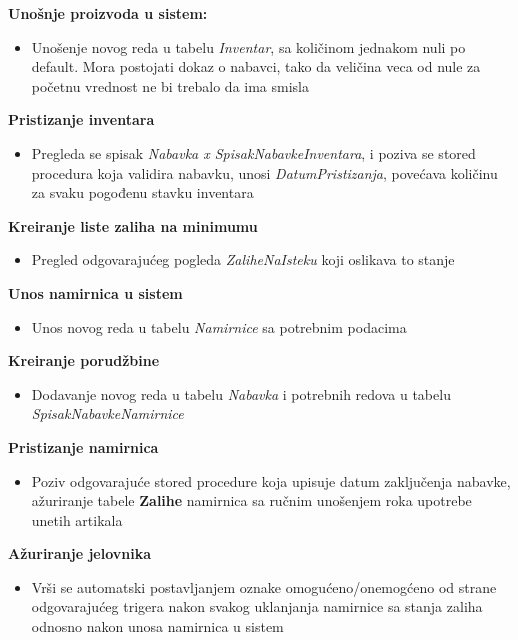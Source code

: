 \documentclass{article}
\begin{document}
\textbf{Unošnje proizvoda u sistem:}
\begin{itemize}
\item Unošenje novog reda u tabelu \emph{Inventar}, sa količinom jednakom nuli po default. Mora postojati dokaz o nabavci, tako da veličina veca od nule za početnu vrednost ne bi trebalo da ima smisla
\end{itemize}

\textbf{Pristizanje inventara}
\begin{itemize}
\item Pregleda se spisak \emph{Nabavka x SpisakNabavkeInventara}, i poziva se stored procedura koja validira nabavku, unosi \emph{DatumPristizanja}, povećava količinu za svaku pogođenu stavku inventara 
\end{itemize}

\textbf{Kreiranje liste zaliha na minimumu}
\begin{itemize}
\item Pregled odgovarajućeg pogleda \emph{ZaliheNaIsteku} koji oslikava to stanje 
\end{itemize}


\textbf{Unos namirnica u sistem}
\begin{itemize}
\item Unos novog reda u tabelu \emph{Namirnice} sa potrebnim podacima 
\end{itemize}

\textbf{Kreiranje porudžbine}
\begin{itemize}
\item Dodavanje novog reda u tabelu \emph{Nabavka} i potrebnih redova u tabelu \emph{SpisakNabavkeNamirnice}
\end{itemize}

\textbf{Pristizanje namirnica}
\begin{itemize}
\item Poziv odgovarajuće stored procedure koja upisuje datum zaključenja nabavke, ažuriranje tabele \textbf{Zalihe} namirnica sa ručnim unošenjem roka upotrebe unetih artikala 
\end{itemize}

\textbf{Ažuriranje jelovnika}
\begin{itemize}
\item Vrši se automatski postavljanjem oznake omogućeno/onemogćeno od strane odgovarajućeg trigera nakon svakog uklanjanja namirnice sa stanja zaliha odnosno nakon unosa namirnica u sistem
\end{itemize}
\end{document}

